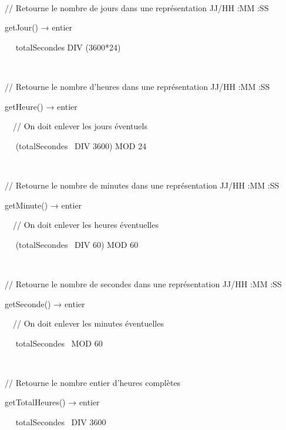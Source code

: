 {\sffamily
{}}

{\sffamily
~}

{\sffamily
// Retourne le nombre de jours dans une représentation JJ/HH :MM :SS}

{\sffamily
{} getJour() → entier}

{\sffamily
\ \  totalSecondes DIV (3600*24) }

{\sffamily
{}}

{\sffamily
~}

{\sffamily
// Retourne le nombre d’heures dans une représentation JJ/HH :MM :SS}

{\sffamily
{} getHeure() → entier}

{\sffamily
\ \ // On doit enlever les jours éventuels }

{\sffamily
\ \  (totalSecondes~ DIV 3600) MOD 24~ }

{\sffamily
{}}

{\sffamily
~}

{\sffamily
// Retourne le nombre de minutes dans une représentation JJ/HH :MM :SS}

{\sffamily
{} getMinute() → entier}

{\sffamily
\ \ // On doit enlever les heures éventuelles}

{\sffamily
\ \  (totalSecondes~ DIV 60) MOD 60 }

{\sffamily
{}}

{\sffamily
~}

{\sffamily
// Retourne le nombre de secondes dans une représentation JJ/HH :MM :SS}

{\sffamily
{} getSeconde() → entier}

{\sffamily
\ \ // On doit enlever les minutes éventuelles}

{\sffamily
\ \  totalSecondes~ MOD 60 }

{\sffamily
{}}

{\sffamily
~}

{\sffamily
// Retourne le nombre entier d’heures complètes}

{\sffamily
{} getTotalHeures() → entier}

{\sffamily
\ \  totalSecondes~ DIV 3600 }

